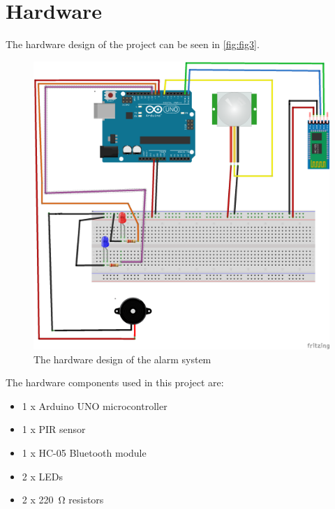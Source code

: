 \documentclass[a4paper,12pt]{report}
\begin{document}
\section{Hardware}

The hardware design of the project can be seen in \autoref{fig:fig3}.

\vspace{5mm}

\begin{figure}[h]

\centering
\includegraphics[scale=0.6]{fig/SchemaFritzing}
\caption{The hardware design of the alarm system}
\label{fig:fig3}

\end{figure}

\vspace{1cm}

The hardware components used in this project are:

\begin{itemize}

\item 1 x Arduino UNO microcontroller
\item 1 x PIR sensor
\item 1 x  HC-05 Bluetooth module
\item 2 x LEDs
\item 2 x \SI{220}{\ohm} resistors

\end{itemize}
\end{document}
